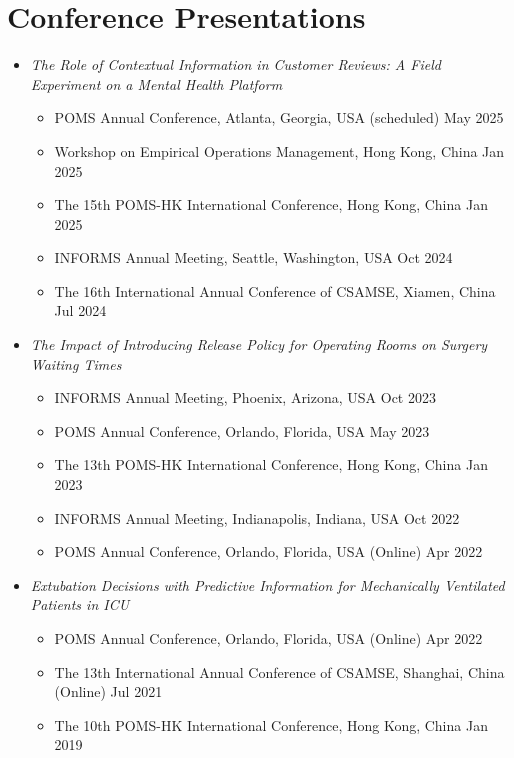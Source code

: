 \documentclass[12pt, a4paper]{article}
\begin{document}
{%

\section*{Conference Presentations}

\begin{itemize}

	\item[] {\it The Role of Contextual Information in Customer Reviews: A Field Experiment on a Mental Health Platform}
	\begin{itemize}
		\item POMS Annual Conference, Atlanta, Georgia, USA (scheduled) \hfill May 2025
		\item Workshop on Empirical Operations Management, Hong Kong, China \hfill Jan 2025
		\item The 15th POMS-HK International Conference, Hong Kong, China \hfill Jan 2025
		\item INFORMS Annual Meeting, Seattle, Washington, USA \hfill Oct 2024
		\item The 16th International Annual Conference of CSAMSE, Xiamen, China \hfill Jul 2024
	\end{itemize}

	\item[] {\it The Impact of Introducing Release Policy for Operating Rooms on Surgery Waiting Times}
	\begin{itemize}
		\item INFORMS Annual Meeting, Phoenix, Arizona, USA \hfill Oct 2023
		\item POMS Annual Conference, Orlando, Florida, USA \hfill May 2023
		\item The 13th POMS-HK International Conference, Hong Kong, China \hfill Jan 2023
		\item INFORMS Annual Meeting, Indianapolis, Indiana, USA \hfill Oct 2022
		\item POMS Annual Conference, Orlando, Florida, USA (Online) \hfill Apr 2022
	\end{itemize}

	\item[] {\it Extubation Decisions with Predictive Information for Mechanically Ventilated Patients in ICU}
	\begin{itemize}
		\item POMS Annual Conference, Orlando, Florida, USA (Online) \hfill Apr 2022
		\item The 13th International Annual Conference of CSAMSE, Shanghai, China (Online) \hfill Jul 2021
		\item The 10th POMS-HK International Conference, Hong Kong, China \hfill Jan 2019
	\end{itemize}


\end{itemize}}
\end{document}
